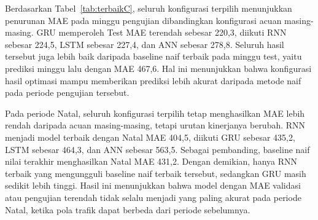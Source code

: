 \documentclass[conference,a4paper]{IEEEtran}
\begin{document}
\begin{table}[H]
\centering
\caption{Perbandingan MAE konfigurasi acuan dan terbaik pada Duomo (rata-rata $\pm$ simpangan baku, tiga seed)}
\label{tab:terbaikC}
\scriptsize
{}
\end{table}

Berdasarkan Tabel~\ref{tab:terbaikC}, seluruh konfigurasi terpilih menunjukkan penurunan MAE pada minggu pengujian dibandingkan konfigurasi acuan masing-masing. GRU memperoleh Test MAE terendah sebesar 220,3, diikuti RNN sebesar 224,5, LSTM sebesar 227,4, dan ANN sebesar 278,8. Seluruh hasil tersebut juga lebih baik daripada baseline naif terbaik pada minggu test, yaitu prediksi minggu lalu dengan MAE 467,6. Hal ini menunjukkan bahwa konfigurasi hasil optimasi mampu memberikan prediksi lebih akurat daripada metode naif pada periode pengujian tersebut.

Pada periode Natal, seluruh konfigurasi terpilih tetap menghasilkan MAE lebih rendah daripada acuan masing-masing, tetapi urutan kinerjanya berubah. RNN menjadi model terbaik dengan Natal MAE 404,5, diikuti GRU sebesar 435,2, LSTM sebesar 464,3, dan ANN sebesar 563,5. Sebagai pembanding, baseline naif nilai terakhir menghasilkan Natal MAE 431,2. Dengan demikian, hanya RNN terbaik yang mengungguli baseline naif terbaik tersebut, sedangkan GRU masih sedikit lebih tinggi. Hasil ini menunjukkan bahwa model dengan MAE validasi atau pengujian terendah tidak selalu menjadi yang paling akurat pada periode Natal, ketika pola trafik dapat berbeda dari periode sebelumnya.
\end{document}
